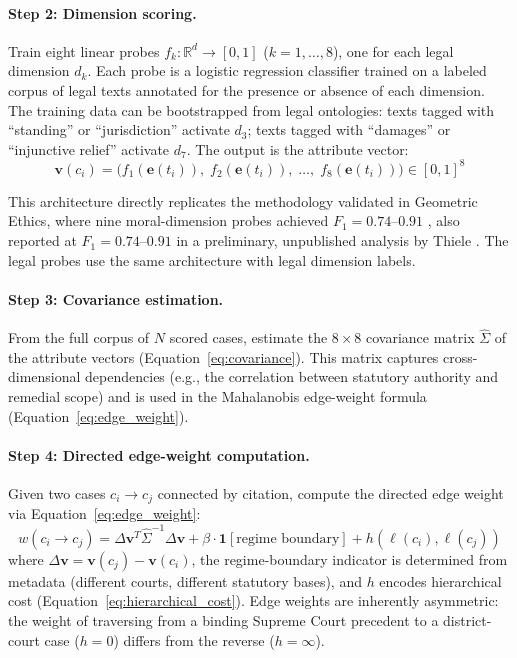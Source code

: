 \documentclass[12pt]{article}
\theoremstyle{definition}
\theoremstyle{remark}
\newcommand{\R}{\mathbb{R}}
\begin{document}
\paragraph{Step 2: Dimension scoring.}  Train eight linear probes $f_k: \R^d \to [0, 1]$ ($k = 1, \ldots, 8$), one for each legal dimension $d_k$.  Each probe is a logistic regression classifier trained on a labeled corpus of legal texts annotated for the presence or absence of each dimension.  The training data can be bootstrapped from legal ontologies: texts tagged with ``standing'' or ``jurisdiction'' activate $d_3$; texts tagged with ``damages'' or ``injunctive relief'' activate $d_7$.  The output is the attribute vector:
\begin{equation}
\mathbf{v}(c_i) = \bigl(f_1(\mathbf{e}(t_i)),\; f_2(\mathbf{e}(t_i)),\; \ldots,\; f_8(\mathbf{e}(t_i))\bigr) \in [0,1]^8
\label{eq:attribute_vector}
\end{equation}

This architecture directly replicates the methodology validated in Geometric Ethics, where nine moral-dimension probes achieved $F_1 = 0.74$--$0.91$ \cite{bond2026geometric}, also reported at $F_1 = 0.74$--$0.91$ in a preliminary, unpublished analysis by Thiele \cite{thiele2026}.  The legal probes use the same architecture with legal dimension labels.

\paragraph{Step 3: Covariance estimation.}  From the full corpus of $N$ scored cases, estimate the $8 \times 8$ covariance matrix $\hat{\Sigma}$ of the attribute vectors (Equation~\ref{eq:covariance}).  This matrix captures cross-dimensional dependencies (e.g., the correlation between statutory authority and remedial scope) and is used in the Mahalanobis edge-weight formula (Equation~\ref{eq:edge_weight}).

\paragraph{Step 4: Directed edge-weight computation.}  Given two cases $c_i \to c_j$ connected by citation, compute the directed edge weight via Equation~\ref{eq:edge_weight}:
\begin{equation}
w(c_i \to c_j) = \Delta \mathbf{v}^T \hat{\Sigma}^{-1} \Delta \mathbf{v} + \beta \cdot \mathbf{1}[\text{regime boundary}] + h(\ell(c_i), \ell(c_j))
\label{eq:edge_weight_nlp}
\end{equation}
where $\Delta \mathbf{v} = \mathbf{v}(c_j) - \mathbf{v}(c_i)$, the regime-boundary indicator is determined from metadata (different courts, different statutory bases), and $h$ encodes hierarchical cost (Equation~\ref{eq:hierarchical_cost}).  Edge weights are inherently asymmetric: the weight of traversing from a binding Supreme Court precedent to a district-court case ($h = 0$) differs from the reverse ($h = \infty$).
\end{document}
